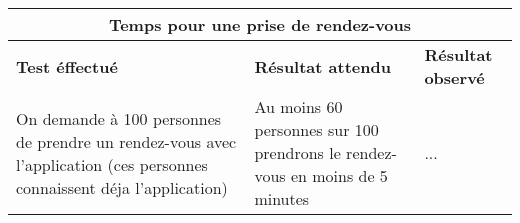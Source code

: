 \documentclass{article}
\begin{document}
  \begin{center}
    \begin{tabular}{|p{5cm}|p{5cm}|p{5cm}|}
      \hline
      \multicolumn{3}{|c|}{\textbf{Temps pour une prise de rendez-vous}} \\
      \hline
      \textbf{Test éffectué} & \textbf{Résultat attendu} & \textbf{Résultat observé} \\
      \hline

      On demande à 100 personnes de prendre un rendez-vous avec l'application (ces personnes connaissent déja l'application)&
      Au moins 60 personnes sur 100 prendrons le rendez-vous en moins de 5 minutes&
      ... \\


      \hline

    \end{tabular}
  \end{center}



  
\end{document}
